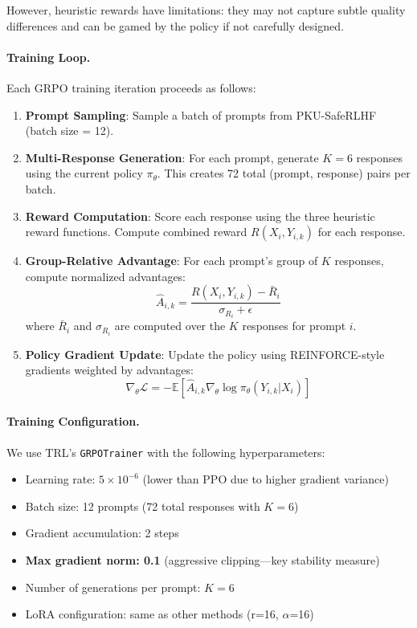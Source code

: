 However, heuristic rewards have limitations: they may not capture subtle quality differences and can be gamed by the policy if not carefully designed.

\paragraph{Training Loop.} Each GRPO training iteration proceeds as follows:

\begin{enumerate}[leftmargin=*]
    \item \textbf{Prompt Sampling}: Sample a batch of prompts from PKU-SafeRLHF (batch size = 12).

    \item \textbf{Multi-Response Generation}: For each prompt, generate $K=6$ responses using the current policy $\pi_\theta$. This creates 72 total (prompt, response) pairs per batch.

    \item \textbf{Reward Computation}: Score each response using the three heuristic reward functions. Compute combined reward $R(X_i, Y_{i,k})$ for each response.

    \item \textbf{Group-Relative Advantage}: For each prompt's group of $K$ responses, compute normalized advantages:
    \begin{equation*}
        \hat{A}_{i,k} = \frac{R(X_i, Y_{i,k}) - \bar{R}_i}{\sigma_{R_i} + \epsilon}
    \end{equation*}
    where $\bar{R}_i$ and $\sigma_{R_i}$ are computed over the $K$ responses for prompt $i$.

    \item \textbf{Policy Gradient Update}: Update the policy using REINFORCE-style gradients weighted by advantages:
    \begin{equation*}
        \nabla_\theta \mathcal{L} = -\mathbb{E}\left[ \hat{A}_{i,k} \nabla_\theta \log \pi_\theta(Y_{i,k} | X_i) \right]
    \end{equation*}
\end{enumerate}

\paragraph{Training Configuration.} We use TRL's \texttt{GRPOTrainer} with the following hyperparameters:
\begin{itemize}[leftmargin=*]
    \item Learning rate: $5 \times 10^{-6}$ (lower than PPO due to higher gradient variance)
    \item Batch size: 12 prompts (72 total responses with $K=6$)
    \item Gradient accumulation: 2 steps
    \item \textbf{Max gradient norm: 0.1} (aggressive clipping---key stability measure)
    \item Number of generations per prompt: $K=6$
    \item LoRA configuration: same as other methods (r=16, $\alpha$=16)
\end{itemize}


